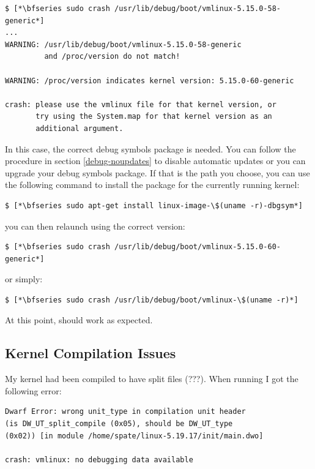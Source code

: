 \begin{lstlisting}
$ [*\bfseries sudo crash /usr/lib/debug/boot/vmlinux-5.15.0-58-generic*]
...
WARNING: /usr/lib/debug/boot/vmlinux-5.15.0-58-generic
         and /proc/version do not match!

WARNING: /proc/version indicates kernel version: 5.15.0-60-generic

crash: please use the vmlinux file for that kernel version, or
       try using the System.map for that kernel version as an 
       additional argument.
\end{lstlisting}

\noindent
In this case, the correct debug symbols package is needed. You can follow the procedure in section \ref{debug-noupdates} to disable automatic updates or you can upgrade your debug symbols package. If that is the path you choose, you can use the following command to install the package for the currently running kernel:

\begin{lstlisting}
$ [*\bfseries sudo apt-get install linux-image-\$(uname -r)-dbgsym*]
\end{lstlisting}

\noindent
you can then relaunch  using the correct version:

\begin{lstlisting}
$ [*\bfseries sudo crash /usr/lib/debug/boot/vmlinux-5.15.0-60-generic*]
\end{lstlisting}

\noindent
or simply:

\begin{lstlisting}
$ [*\bfseries sudo crash /usr/lib/debug/boot/vmlinux-\$(uname -r)*]
\end{lstlisting}


\noindent
At this point,  should work as expected.

\subsection{Kernel Compilation Issues}

My kernel had been compiled to have split files (???). When running  I got the following error:

\begin{lstlisting}
Dwarf Error: wrong unit_type in compilation unit header 
(is DW_UT_split_compile (0x05), should be DW_UT_type 
(0x02)) [in module /home/spate/linux-5.19.17/init/main.dwo]

crash: vmlinux: no debugging data available
\end{lstlisting}

